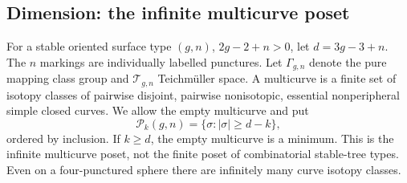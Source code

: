 \subsection{Dimension: the infinite multicurve poset}

For a stable oriented surface type $(g,n)$, $2g-2+n>0$, let
$d=3g-3+n$.  The $n$ markings are individually labelled punctures.
Let $\Gamma_{g,n}$ denote the pure mapping class group and
$\mathcal T_{g,n}$ Teichm\"uller space.  A multicurve is a finite set
of isotopy classes of pairwise disjoint, pairwise nonisotopic,
essential nonperipheral simple closed curves.  We allow the empty
multicurve and put
\[
 \mathcal P_k(g,n)=\{\sigma: |\sigma|\ge d-k\},
\]
ordered by inclusion.  If $k\ge d$, the empty multicurve is a minimum.
This is the infinite multicurve poset, not the finite poset of
combinatorial stable-tree types.  Even on a four-punctured sphere
there are infinitely many curve isotopy classes.

